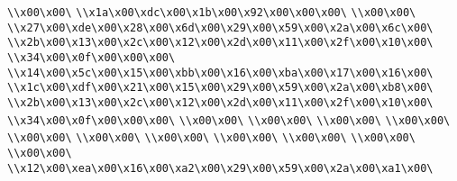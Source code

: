 \verb|\\x00\x00\|\newline
\verb|\\x1a\x00\xdc\x00\x1b\x00\x92\x00\x00\x00\|\newline
\verb|\\x00\x00\|\newline
\verb|\\x27\x00\xde\x00\x28\x00\x6d\x00\x29\x00\x59\x00\x2a\x00\x6c\x00\|\newline
\verb|\\x2b\x00\x13\x00\x2c\x00\x12\x00\x2d\x00\x11\x00\x2f\x00\x10\x00\|\newline
\verb|\\x34\x00\x0f\x00\x00\x00\|\newline
\verb|\\x14\x00\x5c\x00\x15\x00\xbb\x00\x16\x00\xba\x00\x17\x00\x16\x00\|\newline
\verb|\\x1c\x00\xdf\x00\x21\x00\x15\x00\x29\x00\x59\x00\x2a\x00\xb8\x00\|\newline
\verb|\\x2b\x00\x13\x00\x2c\x00\x12\x00\x2d\x00\x11\x00\x2f\x00\x10\x00\|\newline
\verb|\\x34\x00\x0f\x00\x00\x00\|\newline
\verb|\\x00\x00\|\newline
\verb|\\x00\x00\|\newline
\verb|\\x00\x00\|\newline
\verb|\\x00\x00\|\newline
\verb|\\x00\x00\|\newline
\verb|\\x00\x00\|\newline
\verb|\\x00\x00\|\newline
\verb|\\x00\x00\|\newline
\verb|\\x00\x00\|\newline
\verb|\\x00\x00\|\newline
\verb|\\x00\x00\|\newline
\verb|\\x12\x00\xea\x00\x16\x00\xa2\x00\x29\x00\x59\x00\x2a\x00\xa1\x00\|\newline

